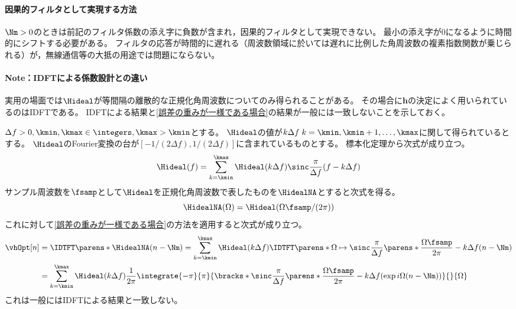             \paragraph{因果的フィルタとして実現する方法}
                \label{因果的フィルタとして実現する方法}
                $\Nm>0$のときは前記のフィルタ係数の添え字に負数が含まれ，因果的フィルタとして実現できない。
                最小の添え字が0になるように時間的にシフトする必要がある。
                フィルタの応答が時間的に遅れる（周波数領域に於いては遅れに比例した角周波数の複素指数関数が乗じられる）が，無線通信等の大抵の用途では問題にならない。
            \paragraph{Note：IDFTによる係数設計との違い}
                実用の場面では$\Hideal$が等間隔の離散的な正規化角周波数についてのみ得られることがある。
                その場合に$\bm{h}$の決定によく用いられているのはIDFTである。
                IDFTによる結果と\ref{誤差の重みが一様である場合}の結果が一般には一致しないことを示しておく。
                \par
                $\Delta f>0,\kmin,\kmax\in\integers,\kmax>\kmin$とする。
                $\Hideal$の値が$k\Delta f\;k=\kmin,\kmin+1,\dots,\kmax$に関して得られているとする。
                $\Hideal$のFourier変換の台が$[-1/(2\Delta f),1/(2\Delta f)]$に含まれているものとする。
                標本化定理から次式が成り立つ。
                \[ \Hideal(f) = \sum_{k=\kmin}^\kmax \Hideal(k\Delta f)\sinc\frac{\pi}{\Delta f}(f-k\Delta f) \]
                サンプル周波数を$\fsamp$として$\Hideal$を正規化角周波数で表したものを$\HidealNA$とすると次式を得る。
                \[ \HidealNA(\Omega) = \Hideal(\Omega\fsamp/(2\pi)) \]
                これに対して\ref{誤差の重みが一様である場合}の方法を適用すると次式が成り立つ。
                \begin{align*}
                    \vhOpt[n] &= \IDTFT\parens*{\HidealNA}(n-\Nm) = \sum_{k=\kmin}^\kmax \Hideal(k\Delta f)\IDTFT\parens*{\Omega\mapsto\sinc\frac{\pi}{\Delta f}\parens*{\frac{\Omega\fsamp}{2\pi}-k\Delta f}}(n-\Nm) \\
                    &= \sum_{k=\kmin}^\kmax \Hideal(k\Delta f)\frac{1}{2\pi}\integrate{-\pi}{\pi}{\bracks*{\sinc\frac{\pi}{\Delta f}\parens*{\frac{\Omega\fsamp}{2\pi}-k\Delta f}}(\exp i\Omega(n-\Nm))}{}{\Omega}
                \end{align*}
                これは一般にはIDFTによる結果と一致しない。
